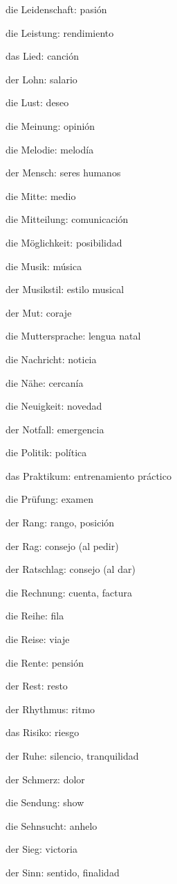 \begin{multicols}{2}
\begin{myitemize}
\item die Leidenschaft: pasión
\item die Leistung: rendimiento
\item das Lied: canción
\item der Lohn: salario
\item die Lust: deseo
\item die Meinung: opinión
\item die Melodie: melodía
\item der Mensch: seres humanos
\item die Mitte: medio
\item die Mitteilung: comunicación
\item die Möglichkeit: posibilidad
\item die Musik: música
\item der Musikstil: estilo musical
\item der Mut: coraje
\item die Muttersprache: lengua natal
\item die Nachricht: noticia
\item die Nähe: cercanía
\item die Neuigkeit: novedad
\item der Notfall: emergencia
\item die Politik: política
\item das Praktikum: entrenamiento práctico
\item die Prüfung: examen
\item der Rang: rango, posición
\item der Rag: consejo (al pedir)
\item der Ratschlag: consejo (al dar)
\item die Rechnung: cuenta, factura
\item die Reihe: fila
\item die Reise: viaje
\item die Rente: pensión
\item der Rest: resto
\item der Rhythmus: ritmo
\item das Risiko: riesgo
\item der Ruhe: silencio, tranquilidad
\item der Schmerz: dolor
\item die Sendung: show
\item die Sehnsucht: anhelo
\item der Sieg: victoria
\item der Sinn: sentido, finalidad

\end{myitemize}
\end{multicols}
